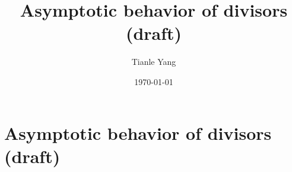 \documentclass{noteformyself}
\title{Asymptotic behavior of divisors (draft)}
\author{Tianle Yang}
\date{\today}
\begin{document}
    \maketitle

    \section{Asymptotic behavior of divisors (draft)}



    \printbibliography[heading=bibintoc, title={References}] %
\end{document}
